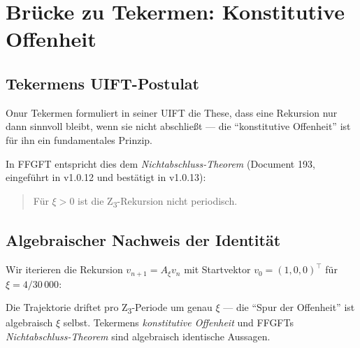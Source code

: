 \section{Brücke zu Tekermen: Konstitutive Offenheit}
\label{sec:tekermen}

\subsection{Tekermens UIFT-Postulat}

Onur Tekermen formuliert in seiner UIFT die These, dass eine Rekursion nur dann sinnvoll bleibt, wenn sie nicht abschließt — die ``konstitutive Offenheit'' ist für ihn ein fundamentales Prinzip.

In FFGFT entspricht dies dem \emph{Nichtabschluss-Theorem} (Document 193, eingeführt in v1.0.12 und bestätigt in v1.0.13):
\begin{quote}
Für \(\xi > 0\) ist die Z\textsubscript{3}-Rekursion nicht periodisch.
\end{quote}

\subsection{Algebraischer Nachweis der Identität}

Wir iterieren die Rekursion \(v_{n+1} = A_\xi v_n\) mit Startvektor \(v_0 = (1, 0, 0)^\top\) für \(\xi = 4/30\,000\):

\begin{table}[h]
\centering
\caption{Trajektorien der Z\textsubscript{3}-Rekursion: ungestört vs.~gestört}
\end{table}

\begin{keyresult}
Die Trajektorie driftet pro Z\textsubscript{3}-Periode um genau \(\xi\) — die ``Spur der Offenheit'' ist algebraisch \(\xi\) selbst. Tekermens \emph{konstitutive Offenheit} und FFGFTs \emph{Nichtabschluss-Theorem} sind algebraisch identische Aussagen.
\end{keyresult}

